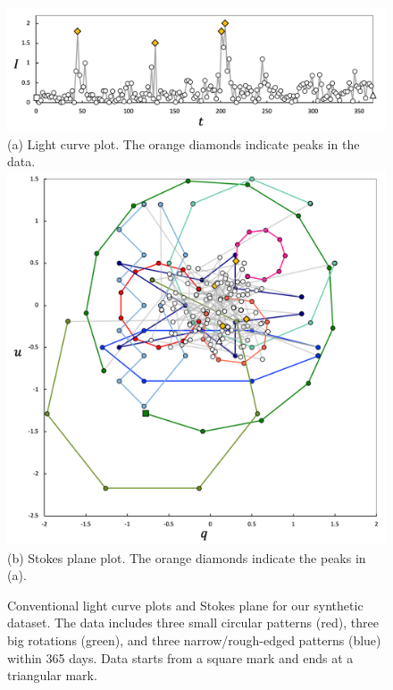 \begin{figure}[t]
    \centering
    \vspace{3mm}
    \includegraphics[width=.8\linewidth]{vgtc_journal_latex/figures/synthesisDataLightCurveLabel_revised.png}\\
    \footnotesize{\sf (a) Light curve plot. The orange diamonds indicate peaks in the data.}\\
    \includegraphics[width=.83\linewidth]{vgtc_journal_latex/figures/synthesisDataStokesLabel_revised.png}\\
    \footnotesize{\sf (b) Stokes plane plot. The orange diamonds indicate the peaks in (a).}
    \caption{Conventional light curve plots and Stokes plane for our synthetic dataset. The data includes three small circular patterns (red), three big rotations (green), and three narrow/rough-edged patterns (blue) within 365 days. Data starts from a square mark and ends at a triangular mark.}
    \label{fig:synthesisData}
\end{figure}





